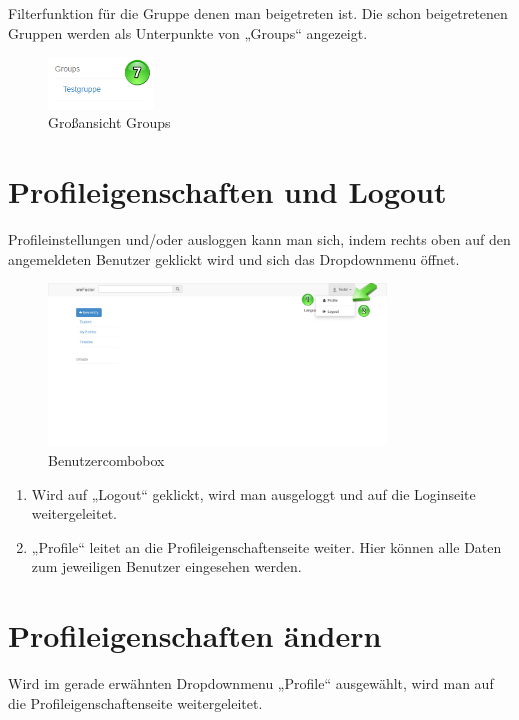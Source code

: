 Filterfunktion für die Gruppe denen man beigetreten ist. Die schon beigetretenen Gruppen werden als Unterpunkte von „Groups“ angezeigt.


\begin{figure}[H]
    \centering
    \includegraphics[width=0.25\textwidth]{Bilder/39.png}
    \caption{Großansicht Groups }
    \label{fig:grossansicht_groups}
\end{figure}


\chapter{Profileigenschaften und Logout}

Profileinstellungen und/oder ausloggen kann man sich, indem rechts oben auf den angemeldeten Benutzer geklickt wird und sich das Dropdownmenu öffnet.

\begin{figure}[H]
    \centering
    \includegraphics[width=0.8\textwidth]{Bilder/7.png}
    \caption{Benutzercombobox }
    \label{fig:beuntzercombobox}
\end{figure}



\begin{enumerate}
\item Wird auf „Logout“ geklickt, wird man ausgeloggt und auf die Loginseite weitergeleitet.
\item „Profile“ leitet an die Profileigenschaftenseite weiter. Hier können alle Daten zum jeweiligen Benutzer eingesehen werden.
\end{enumerate}




\chapter{Profileigenschaften ändern}
Wird im gerade erwähnten Dropdownmenu „Profile“ ausgewählt, wird man auf die Profileigenschaftenseite weitergeleitet.

